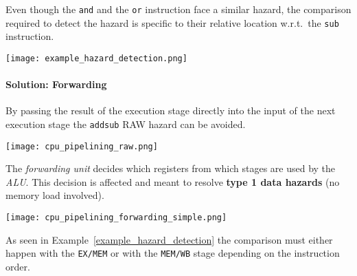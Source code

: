 \begin{examplesection}[Example]\label{example_hazard_detection}
    Even though the \texttt{and} and the \texttt{or} instruction face a similar hazard, the comparison required to detect the hazard is specific to their relative location w.r.t.\ the \texttt{sub} instruction.

    \texttt{[image: example\_hazard\_detection.png]}
\end{examplesection}

\paragraph{Solution: Forwarding}
By passing the result of the execution stage directly into the input of the next execution stage the \texttt{add}\textleftarrow\texttt{sub} RAW hazard can be avoided.

\texttt{[image: cpu\_pipelining\_raw.png]}

The \textit{forwarding unit} decides which registers from which stages are used by the \textit{ALU}. This decision is affected and meant to resolve \textbf{type 1 data hazards} (no memory load involved).

\begin{center}
    \texttt{[image: cpu\_pipelining\_forwarding\_simple.png]}
\end{center}
As seen in Example~\ref{example_hazard_detection} the comparison must either happen with the \texttt{EX/MEM} or with the \texttt{MEM/WB} stage depending on the instruction order.

